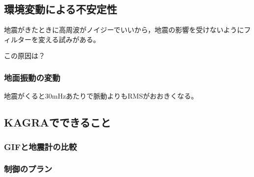 \subsection{環境変動による不安定性}
地震がきたときに高周波がノイジーでいいから，地震の影響を受けないようにフィルターを変える試みがある\cite{biscans2018control}。

この原因は？
\subsubsection{地面振動の変動}
地震がくると30mHzあたりで脈動よりもRMSがおおきくなる。


\subsection{KAGRAでできること}
\subsubsection{GIFと地震計の比較}
\subsubsection{制御のプラン}




